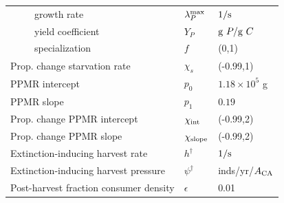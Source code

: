 \documentclass[]{rsos}%
\begin{document}
\begin{table}[h]
\begin{center}
\begin{tabular}{lll}
         ~~~~~growth rate & $\lambda_P^{\rm max}$ & ${\rm 1/s}$ \\
         ~~~~~yield coefficient & $Y_P$ & ${\rm g~}P/{\rm  g~} C$ \\
         ~~~~~specialization & $f$ & (0,1) \\
         \hline
         Prop. change starvation rate & $\chi_s$ & (-0.99,1) \\
         PPMR intercept & $p_0$ & $1.18\times10^5$ g \\
         PPMR slope & $p_1$ & $0.19$ \\
         Prop. change PPMR intercept & $\chi_{\rm int}$ & (-0.99,2) \\
         Prop. change PPMR slope & $\chi_{\rm slope}$ &  (-0.99,2) \\
         Extinction-inducing harvest rate & $h^\dagger$ & ${\rm 1/s}$ \\
         Extinction-inducing harvest pressure & $\psi^\dagger$ & inds/yr/$A_{\rm CA}$ \\
         Post-harvest fraction consumer density & $\epsilon$ & 0.01 \\

        



\end{tabular}
\end{center}
\end{table}
\end{document}
